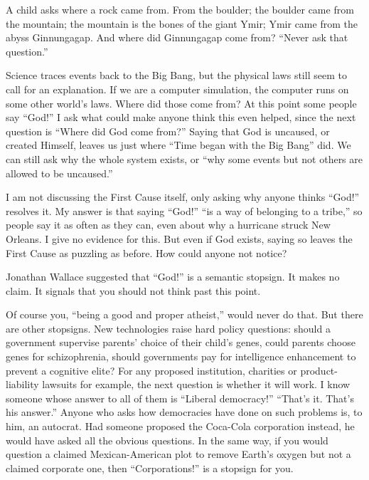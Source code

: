 
A child asks where a rock came from. From the boulder; the boulder came from the mountain; the mountain is the bones of the giant Ymir; Ymir came from the abyss Ginnungagap. And where did Ginnungagap come from? ``Never ask that question.''

Science traces events back to the Big Bang, but the physical laws still seem to call for an explanation. If we are a computer simulation, the computer runs on some other world's laws. Where did those come from? At this point some people say ``God!'' I ask what could make anyone think this even helped, since the next question is ``Where did God come from?'' Saying that God is uncaused, or created Himself, leaves us just where ``Time began with the Big Bang'' did. We can still ask why the whole system exists, or ``why some events but not others are allowed to be uncaused.'' 

I am not discussing the First Cause itself, only asking why anyone thinks ``God!'' resolves it. My answer is that saying ``God!'' ``is a way of belonging to a tribe,'' so people say it as often as they can, even about why a hurricane struck New Orleans. I give no evidence for this. But even if God exists, saying so leaves the First Cause as puzzling as before. How could anyone not notice?

Jonathan Wallace suggested that ``God!'' is a semantic stopsign. It makes no claim. It signals that you should not think past this point. 

Of course you, ``being a good and proper atheist,'' would never do that. But there are other stopsigns. New technologies raise hard policy questions: should a government supervise parents' choice of their child's genes, could parents choose genes for schizophrenia, should governments pay for intelligence enhancement to prevent a cognitive elite? For any proposed institution, charities or product-liability lawsuits for example, the next question is whether it will work. I know someone whose answer to all of them is ``Liberal democracy!'' ``That's it. That's his answer.'' Anyone who asks how democracies have done on such problems is, to him, an autocrat. Had someone proposed the Coca-Cola corporation instead, he would have asked all the obvious questions.  In the same way, if you would question a claimed Mexican-American plot to remove Earth's oxygen but not a claimed corporate one, then ``Corporations!'' is a stopsign for you.

